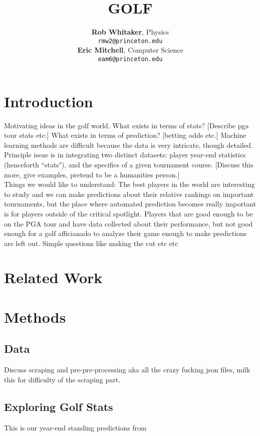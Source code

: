 \documentclass[margin = 0.5in] {article}%
\title{GOLF  }
\author{
\textbf{Rob Whitaker}, 
Physics \\
\texttt{rmw2@princeton.edu} \\
\textbf{Eric Mitchell}, 
Computer Science \\
\texttt{eam6@princeton.edu} \\
}
\begin{document}
\maketitle

\begin{abstract}
\end{abstract}

\section{Introduction}
Motivating ideas in the golf world.  What exists in terms of stats?  [Describe pga tour stats etc.] What exists in terms of prediction? [betting odds etc.]  Machine learning methods are difficult because the data is very intricate, though detailed.\\

Principle issue is in integrating two distinct datasets: player year-end statistics (henceforth ``stats"), and the specifics of a given tournament course.  [Discuss this more, give examples, pretend to be a humanities person.] \\

Things we would like to understand: The best players in the world are interesting to study and we can make predictions about their relative rankings on important tournaments, but the place where automated prediction becomes really important is for players outside of the critical spotlight.  Players that are good enough to be on the PGA tour and have data collected about their performance, but not good enough for a golf afficianado to analyze their game enough to make predictions are left out.  Simple questions like making the cut etc etc

\section{Related Work}

\section{Methods}
\subsection{Data}
Discuss scraping and pre-pre-processing aka all the crazy fucking json files, milk this for difficulty of the scraping part.

\subsection{Exploring Golf Stats}
This is our year-end standing predictions from 
\end{document}
